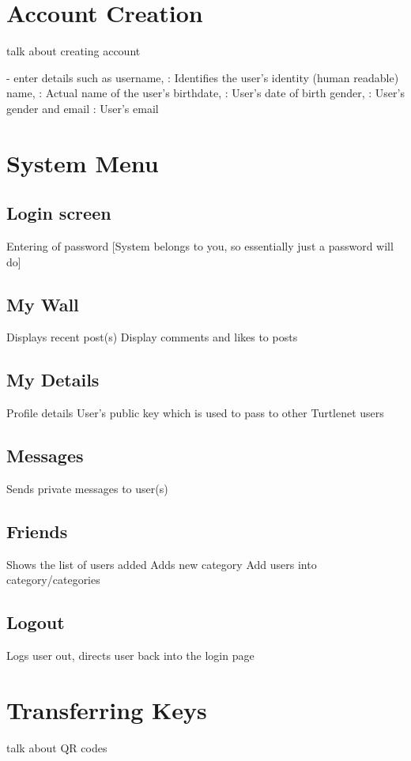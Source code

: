 \section{Account Creation}
talk about creating account

- enter details such as 
username, : Identifies the user's identity (human readable)
name, : Actual name of the user's
birthdate, : User's date of birth
gender, : User's gender
and email : User's email

\section{System Menu}

\subsection{Login screen}
Entering of password [System belongs to you, so essentially just a password will do]

\subsection{My Wall}
Displays recent post(s)
Display comments and likes to posts

\subsection{My Details}
Profile details
User's public key which is used to pass to other Turtlenet users

\subsection{Messages}
Sends private messages to user(s)

\subsection{Friends}
Shows the list of users added
Adds new category
Add users into category/categories

\subsection{Logout}
Logs user out, directs user back into the login page

\section{Transferring Keys}
talk about QR codes